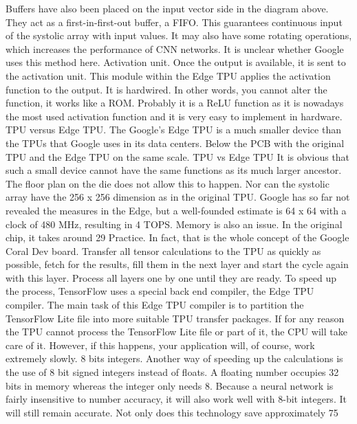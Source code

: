   
Buffers have also been placed on the input vector side in the diagram above. They act as a first-in-first-out buffer, a FIFO. This guarantees continuous input of the systolic array with input values. It may also have some rotating operations, which increases the performance of CNN networks. It is unclear whether Google uses this method here.  
Activation unit.
Once the output is available, it is sent to the activation unit. This module within the Edge TPU applies the activation function to the output. It is hardwired. In other words, you cannot alter the function, it works like a ROM. Probably it is a ReLU function as it is nowadays the most used activation function and it is very easy to implement in hardware.  
TPU versus Edge TPU.
The Google's Edge TPU is a much smaller device than the TPUs that Google uses in its data centers. Below the PCB with the original TPU and the Edge TPU on the same scale.
TPU vs Edge TPU
It is obvious that such a small device cannot have the same functions as its much larger ancestor. The floor plan on the die does not allow this to happen. Nor can the systolic array have the 256 x 256 dimension as in the original TPU. Google has so far not revealed the measures in the Edge, but a well-founded estimate is 64 x 64 with a clock of 480 MHz, resulting in 4 TOPS.
Memory is also an issue. In the original chip, it takes around 29%
Practice.
In fact, that is the whole concept of the Google Coral Dev board. Transfer all tensor calculations to the TPU as quickly as possible, fetch for the results, fill them in the next layer and start the cycle again with this layer. Process all layers one by one until they are ready.
To speed up the process, TensorFlow uses a special back end compiler, the Edge TPU compiler. The main task of this Edge TPU compiler is to partition the TensorFlow Lite file into more suitable TPU transfer packages. If for any reason the TPU cannot process the TensorFlow Lite file or part of it, the CPU will take care of it. However, if this happens, your application will, of course, work extremely slowly.
8 bits integers.
Another way of speeding up the calculations is the use of 8 bit signed integers instead of floats. A floating number occupies 32 bits in memory whereas the integer only needs 8. Because a neural network is fairly insensitive to number accuracy, it will also work well with 8-bit integers. It will still remain accurate. Not only does this technology save approximately 75%

